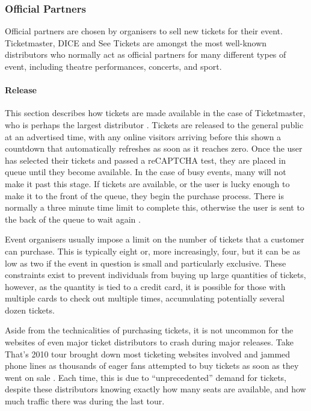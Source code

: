 \documentclass[12pt]{bhamdissertation}
\begin{document}
\subsubsection{Official Partners}

Official partners are chosen by organisers to sell new tickets for their event. Ticketmaster, DICE and See Tickets are amongst the most well-known distributors who normally act as official partners for many different types of event, including theatre performances, concerts, and sport.

\paragraph{Release}

This section describes how tickets are made available in the case of Ticketmaster, who is perhaps the largest distributor \autocite{WF16}. Tickets are released to the general public at an advertised time, with any online visitors arriving before this shown a countdown that automatically refreshes as soon as it reaches zero. Once the user has selected their tickets and passed a reCAPTCHA test, they are placed in queue until they become available. In the case of busy events, many will not make it past this stage. If tickets are available, or the user is lucky enough to make it to the front of the queue, they begin the purchase process. There is normally a three minute time limit to complete this, otherwise the user is sent to the back of the queue to wait again \autocite{T161}.

Event organisers usually impose a limit on the number of tickets that a customer can purchase. This is typically eight or, more increasingly, four, but it can be as low as two if the event in question is small and particularly exclusive. These constraints exist to prevent individuals from buying up large quantities of tickets, however, as the quantity is tied to a credit card, it is possible for those with multiple cards to check out multiple times, accumulating potentially several dozen tickets.

Aside from the technicalities of purchasing tickets, it is not uncommon for the websites of even major ticket distributors to crash during major releases. Take That's 2010 tour brought down most ticketing websites involved and jammed phone lines as thousands of eager fans attempted to buy tickets as soon as they went on sale \autocite{B10}. Each time, this is due to ``unprecedented'' demand for tickets, despite these distributors knowing exactly how many seats are available, and how much traffic there was during the last tour. 
\end{document}
